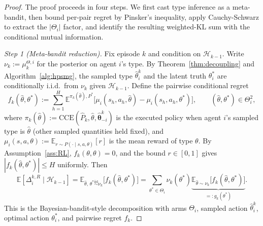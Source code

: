 \documentclass{article}
\begin{document}
\begin{proof}
The proof proceeds in four steps. We first cast type inference as a meta-bandit, then bound per-pair regret by Pinsker's inequality, apply Cauchy-Schwarz to extract the $|\Theta_i|$ factor, and identify the resulting weighted-KL sum with the conditional mutual information.

\textit{Step 1 (Meta-bandit reduction).} Fix episode $k$ and condition on $\mathcal{H}_{k-1}$. Write $\nu_k := \mu_k^{\Theta,i}$ for the posterior on agent $i$'s type. By Theorem~\ref{thm:decoupling} and Algorithm~\ref{alg:hpsmg}, the sampled type $\hat{\theta}_i^k$ and the latent truth $\theta_i^*$ are conditionally i.i.d.\ from $\nu_k$ given $\mathcal{H}_{k-1}$. Define the pairwise conditional regret
\begin{equation}
\label{eq:fk-def}
f_k(\hat{\theta}, \theta^*) := \sum_{h=1}^H \mathbb{E}^{\pi_k(\hat{\theta}), P^*}\big[\mu_i(s_h, a_h, \hat{\theta}) - \mu_i(s_h, a_h, \theta^*)\big], \qquad (\hat{\theta}, \theta^*) \in \Theta_i^2,
\end{equation}
where $\pi_k(\hat{\theta}) := \mathrm{CCE}(\hat{P}_k, \hat{\theta}, \hat{\boldsymbol{\theta}}_{-i}^k)$ is the executed policy when agent $i$'s sampled type is $\hat{\theta}$ (other sampled quantities held fixed), and $\mu_i(s, a, \theta) := \mathbb{E}_{r \sim P(\cdot \mid s, a, \theta)}[r]$ is the mean reward of type $\theta$. By Assumption~\ref{ass:RL}, $f_k(\theta, \theta) = 0$, and the bound $r \in [0, 1]$ gives $|f_k(\hat{\theta}, \theta^*)| \leq H$ uniformly. Then
\begin{equation}
\label{eq:Delta-as-fk}
\mathbb{E}[\Delta_i^{k,R} \mid \mathcal{H}_{k-1}] = \mathbb{E}_{\hat{\theta},\, \theta^* \overset{\text{iid}}{\sim} \nu_k}\big[f_k(\hat{\theta}, \theta^*)\big] = \sum_{\theta^* \in \Theta_i} \nu_k(\theta^*) \underbrace{\mathbb{E}_{\hat{\theta} \sim \nu_k}\big[f_k(\hat{\theta}, \theta^*)\big]}_{=: g_k(\theta^*)}.
\end{equation}
This is the Bayesian-bandit-style decomposition with arms $\Theta_i$, sampled action $\hat{\theta}_i^k$, optimal action $\theta_i^*$, and pairwise regret $f_k$.


\end{proof}
\end{document}
